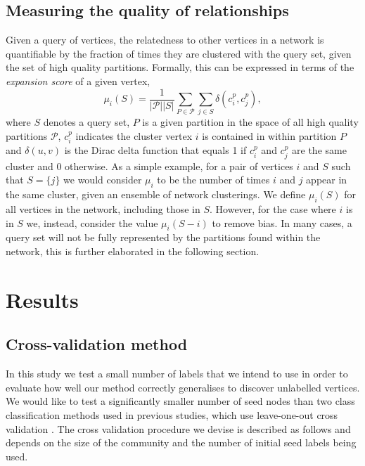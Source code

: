 \documentclass[sigconf]{acmart}
\begin{document}
\subsection{Measuring the quality of relationships} \label{sec:expansion}
Given a query of vertices, the relatedness to other vertices in a network is quantifiable by the fraction of times they are clustered with the query set, given the set of high quality partitions.
Formally, this can be expressed in terms of the \textit{expansion score} of a given vertex,
\begin{equation} \label{eq:mu_score}
\mu_i(S) = \frac{1}{|\mathcal{P}| |S| } \sum_{P \in \mathcal{P}} \sum_{j \in S} \delta(c^{p}_i, c^{p}_j),
\end{equation}
where $S$ denotes a query set, $P$ is a given partition in the space of all high quality partitions $\mathcal{P}$, $c^{p}_{i}$ indicates the cluster vertex $i$ is contained in within partition $P$ and
$\delta(u, v)$ is the Dirac delta function that equals 1 if $c^{p}_i$ and  $c^{p}_j$ are the same cluster and $0$ otherwise.
As a simple example, for a pair of vertices $i$ and $S$ such that $S = \{j\}$ we would consider $\mu_i$ to be the number of times $i$ and $j$ appear in the same cluster, given an ensemble of network clusterings.
We define $\mu_i(S)$ for all vertices in the network, including those in $S$.
However, for the case where $i$ is in $S$ we, instead, consider the value $\mu_i(S - i)$ to remove bias.
In many cases, a query set will not be fully represented by the partitions found within the network, this is further elaborated in the following section.

\section{Results}
\subsection{Cross-validation method}
\label{sec:cross_validation}
In this study we test a small number of labels that we intend to use in order to evaluate how well our method correctly generalises to discover unlabelled vertices.
We would like to test a significantly smaller number of seed nodes than two class classification methods used in previous studies, which use leave-one-out cross validation \cite{kohler2008walking}.
The cross validation procedure we devise is described as follows and depends on the size of the community and the number of initial seed labels being used.
\end{document}
